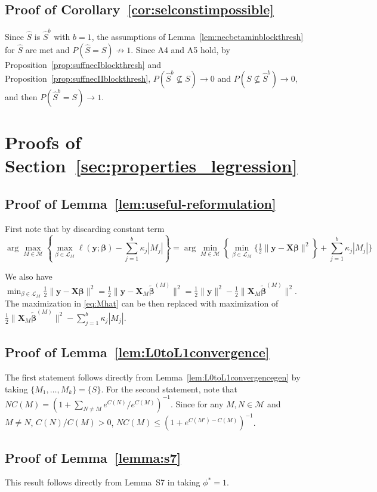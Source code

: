 \documentclass[aos]{imsart}
\theoremstyle{plain}
\newcommand{\M}{\mathcal{M}}
\newcommand{\bs}{\boldsymbol}
\begin{document}
\subsection{Proof of Corollary~\ref{cor:selconstimpossible}}

Since $\hat{S}$ is $\hat{S}^b$ with $b=1$, the assumptions of Lemma~\ref{lem:necbetaminblockthresh} for $\hat{S}$ are met and $P(\hat{S} = S)\not \to 1$. Since A4 and A5 hold, by Proposition~\ref{prop:suffnecIblockthresh} and Proposition~\ref{prop:suffnecIIblockthresh}, $P(\hat{S}^b \not\subseteq S)\to 0$ and $P(S \not\subseteq \hat{S}^b)\to 0$, and then $P(\hat{S}^b = S)\to 1$.

\section{Proofs of Section~\ref{sec:properties_legression}}
\subsection{Proof of Lemma~\ref{lem:useful-reformulation}}
	First note that by discarding constant term 
 $$\arg\max_{M\in \M} \left\{\max_{\beta\in \mathcal{L}_M}\ell(\bs y; \bs \beta)-\sum_{j=1}^b\kappa_j |M_j| \right\}=\arg\min_{M\in \M} \left\{\min_{\beta\in \mathcal{L}_M}\bigg\{ \tfrac{1}{2}\|\bs y-\bs X\bs\beta\|^2\right\}+\sum_{j=1}^b\kappa_j |M_j| \bigg\}$$
 
 We also have $\min_{\beta\in \mathcal{L}_M} \tfrac{1}{2}\|\bs y-\bs X\bs\beta\|^2=\tfrac{1}{2}\|\bs y-\bs X_{\!\!M}\tilde{\bs \beta}^{(M)}\|^2=\tfrac{1}{2}\|\bs y\|^2-\tfrac{1}{2}\|\bs X_{\!\!M}\tilde{\bs\beta}^{(M)}\|^2$. The maximization in \eqref{eq:Mhat} can be then replaced with maximization of $\tfrac{1}{2}
 \|\bs X_{\!\!M}\tilde{\bs\beta}^{(M)}\|^2-\sum_{j=1}^b \kappa_j|M_j|$.

\subsection{Proof of Lemma~\ref{lem:L0toL1convergence}}
The first statement follows directly from Lemma~\ref{lem:L0toL1convergencegen} by taking $\{M_1,\ldots,M_k\}=\{S\}$. For the second statement, note that  $NC(M)=(1+\sum_{N \neq M} e^{C(N)}/ e^{C(M)})^{-1}$. Since for any $M,N\in \M$ and $M\neq N$, $C(N) / C(M)>0$, $NC(M) \leq (1+e^{C(M')-C(M)})^{-1}$.

\subsection{Proof of Lemma~\ref{lemma:s7}}
    This result follows directly from Lemma~S7 in \cite{rossell2022concentration} taking $\phi^*=1$.
\end{document}
